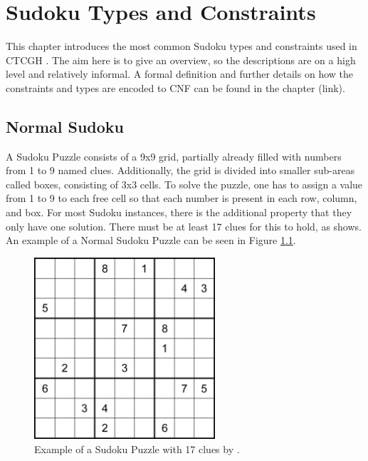 \chapter{Sudoku Types and Constraints}
This chapter introduces the most common Sudoku types and constraints used in CTCGH \cite{CrackingTheCryptic2021}. The aim here is to give an overview, so the descriptions are on a high level and relatively informal. A formal definition and further details on how the constraints and types are encoded to CNF can be found in the chapter (link).

\section{Normal Sudoku}\label{\thechapter:NormalSudoku}
A Sudoku Puzzle consists of a 9x9 grid, partially already filled with numbers from 1 to 9 named clues. Additionally, the grid is divided into smaller sub-areas called boxes, consisting of  3x3 cells. To solve the puzzle, one has to assign a value from 1 to 9 to each free cell so that each number is present in each row, column, and box.
For most Sudoku instances, there is the additional property that they only have one solution. There must be at least 17 clues for this to hold, as \citet{https://doi.org/10.48550/arxiv.1201.0749} shows. An example of a Normal Sudoku Puzzle can be seen in Figure \ref{fig:exampleSudoku}.

\begin{figure}
\centering
\includegraphics[width=0.6\textwidth]{Figures/17-clue sudoku puzzle (McGuire).png}
\caption{Example of a Sudoku Puzzle with 17 clues by \citet{https://doi.org/10.48550/arxiv.1201.0749}.}
\label{fig:exampleSudoku}
\end{figure}

